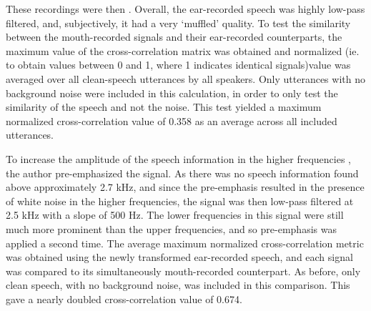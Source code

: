 These recordings were then \DIFdelbegin {}\DIFdelend \DIFaddbegin {}\DIFaddend .  Overall, the ear-recorded speech was highly low-pass filtered, and, subjectively, it had a very `muffled' quality.  To test the similarity between the mouth-recorded signals and their ear-recorded counterparts, the maximum value of the cross-correlation matrix was obtained and normalized (ie. to obtain values between 0 and 1, where 1 indicates identical signals)\DIFdelbegin {}\DIFdelend \DIFaddbegin {}\DIFaddend value was averaged over all clean-speech utterances by all speakers.  Only utterances with no background noise were included in this calculation, in order to only test the similarity of the speech and not the noise.  This test yielded a maximum normalized cross-correlation value of 0.358 as an average across all included utterances.

To increase the amplitude of the speech information in the higher frequencies \DIFaddbegin {}\DIFaddend , the author pre-emphasized the signal.  As there was no speech information found above approximately 2.7 kHz, and since the pre-emphasis resulted in the presence of white noise in the higher frequencies, the signal was then low-pass filtered at 2.5 kHz with a slope of 500 Hz.  The lower frequencies in this signal were still much more prominent than the upper frequencies, and so pre-emphasis was applied a second time.  The average maximum normalized cross-correlation metric was obtained using the newly transformed ear-recorded speech, and each signal was compared to its simultaneously mouth-recorded counterpart.  As before, only clean speech, with no background noise, was included in this comparison.  This gave a nearly doubled cross-correlation value of 0.674\DIFaddbegin {}\DIFaddend .


